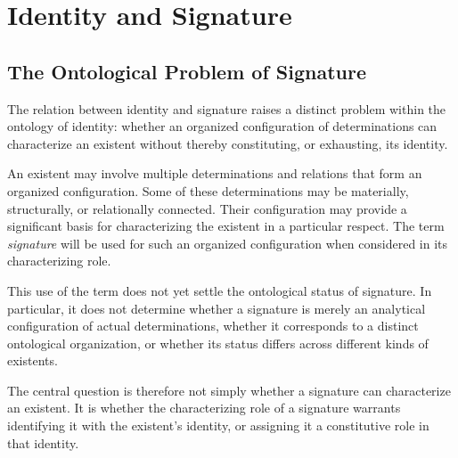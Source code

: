 %
%
%
%

\section{Identity and Signature}
\label{sec:identity-and-signature}

\subsection{The Ontological Problem of Signature}

The relation between identity and signature raises a distinct
problem within the ontology of identity: whether an organized
configuration of determinations can characterize an existent
without thereby constituting, or exhausting, its identity.

An existent may involve multiple determinations and relations
that form an organized configuration. Some of these
determinations may be materially, structurally, or relationally
connected. Their configuration may provide a significant basis
for characterizing the existent in a particular respect. The
term \emph{signature} will be used for such an organized
configuration when considered in its characterizing role.

This use of the term does not yet settle the ontological status
of signature. In particular, it does not determine whether a
signature is merely an analytical configuration of actual
determinations, whether it corresponds to a distinct
ontological organization, or whether its status differs across
different kinds of existents.

The central question is therefore not simply whether a
signature can characterize an existent. It is whether the
characterizing role of a signature warrants identifying it
with the existent's identity, or assigning it a constitutive
role in that identity.

